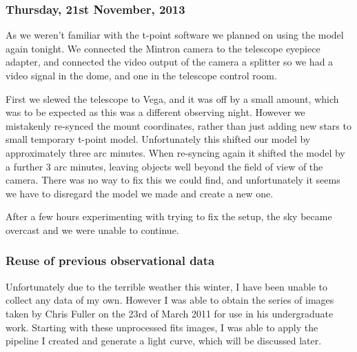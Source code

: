 \subsubsection*{Thursday, 21st November, 2013}

As we weren't familiar with the t-point software we planned on using the model again tonight. We connected the Mintron camera to the telescope eyepiece adapter, and connected the video output of the camera a splitter so we had a video signal in the dome, and one in the telescope control room.

First we slewed the telescope to Vega, and it was off by a small amount, which was to be expected as this was a different observing night. However we mistakenly re-synced the mount coordinates, rather than just adding new stars to small temporary t-point model. Unfortunately this shifted our model by approximately three arc minutes. When re-syncing again it shifted the model by a further 3 arc minutes, leaving objects well beyond the field of view of the camera. There was no way to fix this we could find, and unfortunately it seems we have to disregard the model we made and create a new one.

After a few hours experimenting with trying to fix the setup, the sky became overcast and we were unable to continue.

\subsubsection{Reuse of previous observational data}

Unfortunately due to the terrible weather this winter, I have been unable to collect any data of my own. However I was able to obtain the series of images taken by Chris Fuller on the 23rd of March 2011 for use in his undergraduate work. Starting with these unprocessed fits images, I was able to apply the pipeline I created and generate a light curve, which will be discussed later.